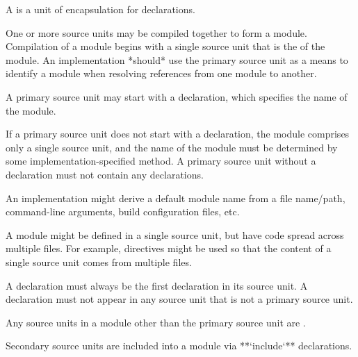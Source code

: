 
A  is a unit of encapsulation for declarations.


One or more source units may be compiled together to form a module.
Compilation of a module begins with a single source unit that is the  of the module.
An implementation *should* use the primary source unit as a means to identify a module when resolving references from one module to another.

A primary source unit may start with a  declaration, which specifies the name of the module.

\begin{Syntax}
      \code{;}
\end{Syntax}

If a primary source unit does not start with a  declaration, the module comprises only a single source unit, and the name of the module must be determined by some implementation-specified method.
A primary source unit without a  declaration must not contain any  declarations.

\begin{Note}
An implementation might derive a default module name from a file name/path, command-line arguments, build configuration files, etc.
\end{Note}

\begin{Note}
A module might be defined in a single source unit, but have code spread across multiple files.
For example,  directives might be used so that the content of a single source unit comes from multiple files.
\end{Note}

A  declaration must always be the first declaration in its source unit.
A  declaration must not appear in any source unit that is not a primary source unit.


Any source units in a module other than the primary source unit are .


Secondary source units are included into a module via **`include`** declarations.

